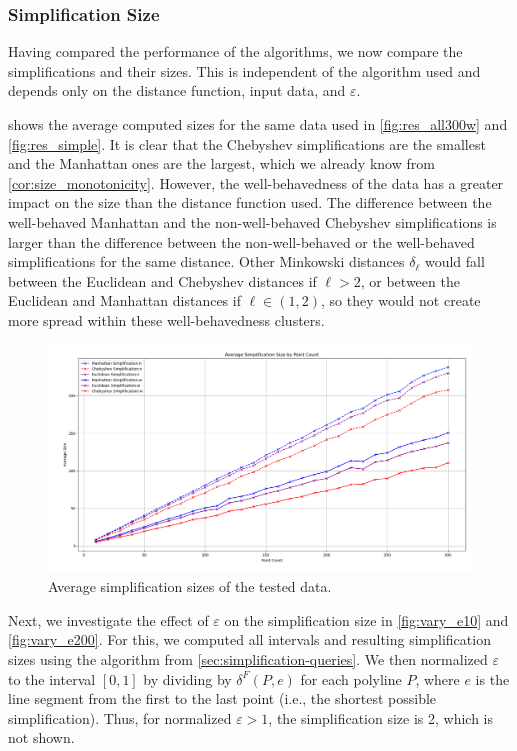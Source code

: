 \subsubsection{Simplification Size}
\label{ssubsec:simplification_size}
Having compared the performance of the algorithms, we now compare the simplifications and their sizes. This is independent of the algorithm used and depends only on the distance function, input data, and \(\varepsilon\).

 shows the average computed sizes for the same data used in \cref{fig:res_all300w} and \cref{fig:res_simple}. It is clear that the Chebyshev simplifications are the smallest and the Manhattan ones are the largest, which we already know from \cref{cor:size_monotonicity}. However, the well-behavedness of the data has a greater impact on the size than the distance function used. The difference between the well-behaved Manhattan and the non-well-behaved Chebyshev simplifications is larger than the difference between the non-well-behaved or the well-behaved simplifications for the same distance. Other Minkowski distances \(\delta_\ell\) would fall between the Euclidean and Chebyshev distances if \(\ell > 2\), or between the Euclidean and Manhattan distances if \(\ell \in (1,2)\), so they would not create more spread within these well-behavedness clusters.

\begin{figure}[b]
  \centering
	\includegraphics[scale=0.4]{./figures/simplification_sizes.png}
  \caption{Average simplification sizes of the tested data.}
  \label{fig:simplification_sizes}
\end{figure}

Next, we investigate the effect of \(\varepsilon\) on the simplification size in \cref{fig:vary_e10} and \cref{fig:vary_e200}. For this, we computed all intervals and resulting simplification sizes using the algorithm from \cref{sec:simplification-queries}. We then normalized \(\varepsilon\) to the interval \([0, 1]\) by dividing by \(\delta^F(P, e)\) for each polyline \(P\), where \(e\) is the line segment from the first to the last point (i.e., the shortest possible simplification). Thus, for normalized \(\varepsilon > 1\), the simplification size is 2, which is not shown.

